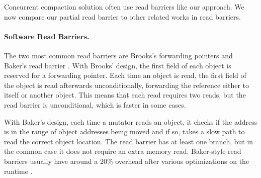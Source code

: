 \documentclass[sigplan,10pt,review,anonymous]{acmart}\settopmatter{printfolios=true,printccs=false,printacmref=false}
\providecommand{\DIFdelbegin}{} %
\begin{document}
Concurrent compaction solution often use read barriers like our approach. We now compare our partial read barrier to other related works in read barriers.


\paragraph{Software Read Barriers.}
The two most common read barriers are Brooks's forwarding pointers \cite{BrooksForwarders} and Baker's read barrier \cite{BakerReadBarrier}.
With Brooks' design, the first field of each object is reserved for a forwarding pointer. Each time an object is read, the first field of the object is read afterwards unconditionally, forwarding the reference either to itself or another object. This means that each read requires two reads, but the read barrier is unconditional, which is faster in some cases.

With Baker's design, each time a mutator reads an object, it checks if the address is in the range of object addresses being moved and if so, takes a slow path to read the correct object location. The read barrier has at least one branch, but in the common case it does not require an extra memory read. Baker-style read barriers usually have around a 20\% overhead after various optimizations on the runtime \cite{BarrierMethods}.
\DIFdelbegin %
\end{document}

